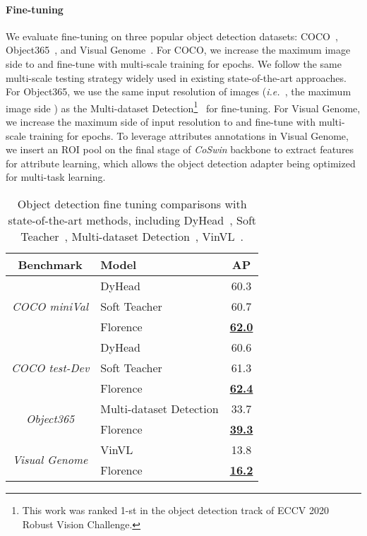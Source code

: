 \documentclass{article}
\newcommand{\ie}{{\it{i.e.}~}}
\begin{document}
\paragraph{Fine-tuning} We evaluate fine-tuning on three popular object detection datasets:
COCO~\cite{lin2015microsoft}, Object365~\cite{Shao_2019_ICCV}, and Visual
Genome~\cite{krishnavisualgenome}. For COCO, we increase the maximum image side to  and
fine-tune with multi-scale training for  epochs. We follow the same multi-scale testing strategy
widely used in existing state-of-the-art approaches. For Object365, we use the same input resolution
of images (\ie, the maximum image side ) as the Multi-dataset Detection\footnote{This work was ranked 1-st
in the object detection track of ECCV 2020 Robust Vision Challenge.}~\cite{zhou2021simple} for
fine-tuning. For Visual Genome, we increase the maximum side of input resolution to  and
fine-tune with multi-scale training for  epochs. To leverage attributes annotations in Visual
Genome, we insert an  ROI pool on the final stage of \emph{CoSwin} backbone to extract
features for attribute learning, which allows the object detection adapter being optimized for multi-task
learning.


\begin{table}[t]
\centering
\setlength{\tabcolsep}{12.5pt}
\small
\renewcommand{\arraystretch}{1.35}
\begin{tabular}{c|l|c}
\toprule
Benchmark & Model & AP  \\ \midrule
\multirow{3}{*}{\it{COCO miniVal}} & DyHead & 60.3 \\
& Soft Teacher & 60.7 \\
& Florence & \underline{\bf{62.0}} \\ \midrule
\multirow{3}{*}{\it{COCO test-Dev}} & DyHead & 60.6 \\
& Soft Teacher & 61.3 \\
& Florence & \underline{\bf{62.4}} \\ \midrule
\multirow{2}{*}{\it{Object365}} & Multi-dataset Detection & 33.7 \\
& Florence & \underline{\bf{39.3}} \\ \midrule
\multirow{2}{*}{\it{Visual Genome}} & VinVL & 13.8 \\
& Florence & \underline{\bf{16.2}} \\
\bottomrule
\end{tabular}
\caption{Object detection fine tuning comparisons with state-of-the-art methods, including DyHead~\cite{Dai_2021_CVPR}, Soft Teacher~\cite{Xu_2021_ICCV}, Multi-dataset Detection~\cite{zhou2021simple}, VinVL~\cite{Zhang_2021_CVPR}.}
\label{tab:od_result}
\end{table}
\end{document}
